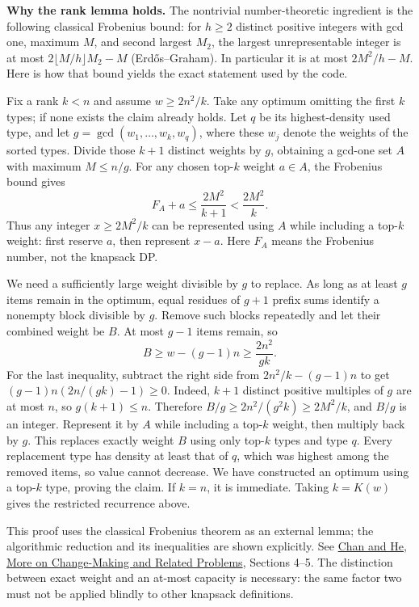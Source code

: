 \textbf{Why the rank lemma holds.} The nontrivial number-theoretic
ingredient is the following classical Frobenius bound:
for $h\ge2$ distinct positive integers with gcd one, maximum $M$,
and second largest $M_2$, the largest unrepresentable integer is
at most $2\lfloor M/h\rfloor M_2-M$ (Erd\H{o}s--Graham).
In particular it is at most $2M^2/h-M$.
Here is how that bound yields the exact statement used by the code.

Fix a rank $k<n$ and assume $w\ge2n^2/k$. Take any optimum omitting
the first $k$ types; if none exists the claim already holds.
Let $q$ be its highest-density used type, and let
$g=\gcd(w_1,\ldots,w_k,w_q)$, where these $w_j$ denote the weights
of the sorted types. Divide those $k+1$ distinct weights by $g$,
obtaining a gcd-one set $A$ with maximum $M\le n/g$.
For any chosen top-$k$ weight $a\in A$, the Frobenius bound gives
\[
 F_A+a\le\frac{2M^2}{k+1}<\frac{2M^2}{k}.
\]
Thus any integer $x\ge2M^2/k$ can be represented using $A$ while
including a top-$k$ weight: first reserve $a$, then represent $x-a$.
Here $F_A$ means the Frobenius number, not the knapsack DP.

We need a sufficiently large weight divisible by $g$ to replace.
As long as at least $g$ items remain in the optimum, equal residues
of $g+1$ prefix sums identify a nonempty block divisible by $g$.
Remove such blocks repeatedly and let their combined weight be $B$.
At most $g-1$ items remain, so
\[
 B\ge w-(g-1)n\ge\frac{2n^2}{gk}.
\]
For the last inequality, subtract the right side from
$2n^2/k-(g-1)n$ to get
$(g-1)n(2n/(gk)-1)\ge0$.
Indeed, $k+1$ distinct positive multiples of $g$ are at most $n$,
so $g(k+1)\le n$. Therefore
$B/g\ge2n^2/(g^2k)\ge2M^2/k$, and $B/g$ is an integer.
Represent it by $A$ while including a top-$k$ weight, then multiply
back by $g$. This replaces exactly weight $B$ using only top-$k$
types and type $q$. Every replacement type has density at least
that of $q$, which was highest among the removed items, so value
cannot decrease. We have constructed an optimum using a top-$k$
type, proving the claim. If $k=n$, it is immediate.
Taking $k=K(w)$ gives the restricted recurrence above.

This proof uses the classical Frobenius theorem as an external
lemma; the algorithmic reduction and its inequalities are shown
explicitly. See
\href{https://arxiv.org/abs/2110.02503}{Chan and He, More on
Change-Making and Related Problems}, Sections 4--5.
The distinction between exact weight and an at-most capacity is
necessary: the same factor two must not be applied blindly to
other knapsack definitions.

